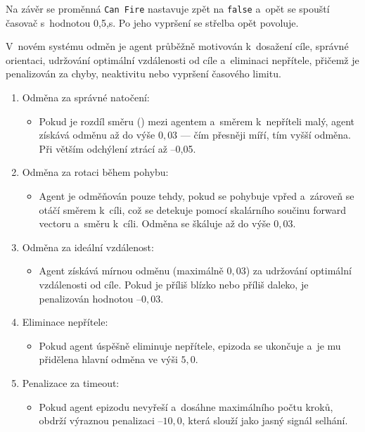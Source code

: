 Na závěr se proměnná \texttt{Can Fire} nastavuje zpět na \texttt{false} a~opět se spouští časovač s~hodnotou 0{,}5,s. Po jeho vypršení se střelba opět povoluje.

V~novém systému odměn je agent průběžně motivován k~dosažení cíle, správné orientaci, udržování optimální vzdálenosti od cíle a~eliminaci nepřítele, přičemž je penalizován za chyby, neaktivitu nebo vypršení časového limitu.

\begin{enumerate}
\item Odměna za správné natočení:
\begin{itemize}
\item Pokud je rozdíl směru () mezi agentem a~směrem k~nepříteli malý, agent získává odměnu až do výše $0{,}03$ — čím přesněji míří, tím vyšší odměna. Při větším odchýlení ztrácí až –0{,}05.
\end{itemize}

\item Odměna za rotaci během pohybu:
\begin{itemize}
\item Agent je odměňován pouze tehdy, pokud se pohybuje vpřed a~zároveň se otáčí směrem k~cíli, což se detekuje pomocí skalárního součinu forward vectoru a~směru k~cíli. Odměna se škáluje až do výše $0{,}03$.
\end{itemize}

\item Odměna za ideální vzdálenost:
\begin{itemize}
\item Agent získává mírnou odměnu (maximálně $0{,}03$) za udržování optimální vzdálenosti od cíle. Pokud je příliš blízko nebo příliš daleko, je penalizován hodnotou –$0{,}03$.
\end{itemize}

\item Eliminace nepřítele:
\begin{itemize}
\item Pokud agent úspěšně eliminuje nepřítele, epizoda se ukončuje a~je mu přidělena hlavní odměna ve výši $5{,}0$.
\end{itemize}

\item Penalizace za timeout:
\begin{itemize}
\item Pokud agent epizodu nevyřeší a~dosáhne maximálního počtu kroků, obdrží výraznou penalizaci –$10{,}0$, která slouží jako jasný signál selhání.
\end{itemize}
\end{enumerate}

